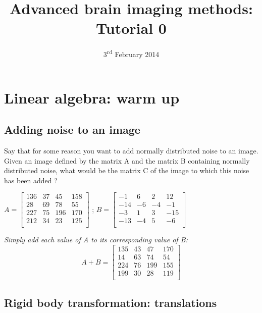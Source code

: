 \documentclass[a4paper,10pt]{article}
\title{Advanced brain imaging methods: Tutorial 0}
\author{}
\date{3\textsuperscript{rd} February 2014}
\begin{document}
\maketitle



\section{Linear algebra: warm up}


\subsection{Adding noise to an image}

Say that for some reason you want to add normally distributed noise to an image. Given an image defined by the matrix A and the matrix B containing normally distributed noise, what would be the matrix C of the image to which this noise has been added ? 

\bigskip
$ A =
\left[\begin{array}{cccc}
136	& 37	& 45	& 158\\ 
28	& 69	& 78	& 55 \\
227	& 75	& 196	& 170\\
212	& 34	& 23	& 125\\
\end{array}\right] 
$
;
$B =
\left[\begin{array}{cccc}
-1	& 6	& 2	& 12\\
-14	& -6	& -4	& -1\\
-3	& 1	& 3	& -15\\
-13	& -4	& 5	& -6\\
\end{array}\right] 
$

\bigskip
\textit{Simply add each value of A to its corresponding value of B:}
\begin{displaymath}
  A+B = 
  \left[\begin{array}{cccc}
  135	& 43	& 47	& 170\\
  14	& 63	& 74	& 54\\
  224	& 76	& 199	& 155\\
  199	& 30	& 28	& 119\\
  \end{array}\right]
\end{displaymath}


\subsection{Rigid body transformation: translations}
\end{document}
